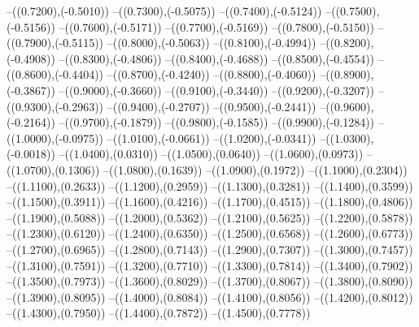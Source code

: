 {	--({\sx*(0.7200)},{\sy*(-0.5010)})
	--({\sx*(0.7300)},{\sy*(-0.5075)})
	--({\sx*(0.7400)},{\sy*(-0.5124)})
	--({\sx*(0.7500)},{\sy*(-0.5156)})
	--({\sx*(0.7600)},{\sy*(-0.5171)})
	--({\sx*(0.7700)},{\sy*(-0.5169)})
	--({\sx*(0.7800)},{\sy*(-0.5150)})
	--({\sx*(0.7900)},{\sy*(-0.5115)})
	--({\sx*(0.8000)},{\sy*(-0.5063)})
	--({\sx*(0.8100)},{\sy*(-0.4994)})
	--({\sx*(0.8200)},{\sy*(-0.4908)})
	--({\sx*(0.8300)},{\sy*(-0.4806)})
	--({\sx*(0.8400)},{\sy*(-0.4688)})
	--({\sx*(0.8500)},{\sy*(-0.4554)})
	--({\sx*(0.8600)},{\sy*(-0.4404)})
	--({\sx*(0.8700)},{\sy*(-0.4240)})
	--({\sx*(0.8800)},{\sy*(-0.4060)})
	--({\sx*(0.8900)},{\sy*(-0.3867)})
	--({\sx*(0.9000)},{\sy*(-0.3660)})
	--({\sx*(0.9100)},{\sy*(-0.3440)})
	--({\sx*(0.9200)},{\sy*(-0.3207)})
	--({\sx*(0.9300)},{\sy*(-0.2963)})
	--({\sx*(0.9400)},{\sy*(-0.2707)})
	--({\sx*(0.9500)},{\sy*(-0.2441)})
	--({\sx*(0.9600)},{\sy*(-0.2164)})
	--({\sx*(0.9700)},{\sy*(-0.1879)})
	--({\sx*(0.9800)},{\sy*(-0.1585)})
	--({\sx*(0.9900)},{\sy*(-0.1284)})
	--({\sx*(1.0000)},{\sy*(-0.0975)})
	--({\sx*(1.0100)},{\sy*(-0.0661)})
	--({\sx*(1.0200)},{\sy*(-0.0341)})
	--({\sx*(1.0300)},{\sy*(-0.0018)})
	--({\sx*(1.0400)},{\sy*(0.0310)})
	--({\sx*(1.0500)},{\sy*(0.0640)})
	--({\sx*(1.0600)},{\sy*(0.0973)})
	--({\sx*(1.0700)},{\sy*(0.1306)})
	--({\sx*(1.0800)},{\sy*(0.1639)})
	--({\sx*(1.0900)},{\sy*(0.1972)})
	--({\sx*(1.1000)},{\sy*(0.2304)})
	--({\sx*(1.1100)},{\sy*(0.2633)})
	--({\sx*(1.1200)},{\sy*(0.2959)})
	--({\sx*(1.1300)},{\sy*(0.3281)})
	--({\sx*(1.1400)},{\sy*(0.3599)})
	--({\sx*(1.1500)},{\sy*(0.3911)})
	--({\sx*(1.1600)},{\sy*(0.4216)})
	--({\sx*(1.1700)},{\sy*(0.4515)})
	--({\sx*(1.1800)},{\sy*(0.4806)})
	--({\sx*(1.1900)},{\sy*(0.5088)})
	--({\sx*(1.2000)},{\sy*(0.5362)})
	--({\sx*(1.2100)},{\sy*(0.5625)})
	--({\sx*(1.2200)},{\sy*(0.5878)})
	--({\sx*(1.2300)},{\sy*(0.6120)})
	--({\sx*(1.2400)},{\sy*(0.6350)})
	--({\sx*(1.2500)},{\sy*(0.6568)})
	--({\sx*(1.2600)},{\sy*(0.6773)})
	--({\sx*(1.2700)},{\sy*(0.6965)})
	--({\sx*(1.2800)},{\sy*(0.7143)})
	--({\sx*(1.2900)},{\sy*(0.7307)})
	--({\sx*(1.3000)},{\sy*(0.7457)})
	--({\sx*(1.3100)},{\sy*(0.7591)})
	--({\sx*(1.3200)},{\sy*(0.7710)})
	--({\sx*(1.3300)},{\sy*(0.7814)})
	--({\sx*(1.3400)},{\sy*(0.7902)})
	--({\sx*(1.3500)},{\sy*(0.7973)})
	--({\sx*(1.3600)},{\sy*(0.8029)})
	--({\sx*(1.3700)},{\sy*(0.8067)})
	--({\sx*(1.3800)},{\sy*(0.8090)})
	--({\sx*(1.3900)},{\sy*(0.8095)})
	--({\sx*(1.4000)},{\sy*(0.8084)})
	--({\sx*(1.4100)},{\sy*(0.8056)})
	--({\sx*(1.4200)},{\sy*(0.8012)})
	--({\sx*(1.4300)},{\sy*(0.7950)})
	--({\sx*(1.4400)},{\sy*(0.7872)})
	--({\sx*(1.4500)},{\sy*(0.7778)})
}
